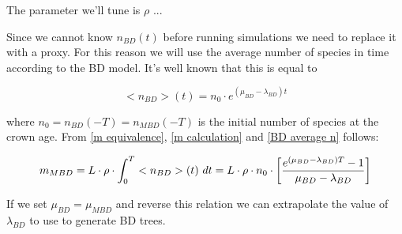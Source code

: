 \begin{itemize}
The parameter we'll tune is $\rho$ ... 

Since we cannot know $n_{BD}(t)$ before running simulations
we need to replace it with a proxy. 
For this reason we will use the average number of
species in time according to the BD model. 
It's well known that this is equal to 

\begin{equation}
    <n_{BD}>(t) = n_{0} \cdot e^{(\mu_{BD} - \lambda_{BD})t} \label{BD average n}
\end{equation}

where $n_{0} = n_{BD}(-T) = n_{MBD}(-T)$ is the initial number of species 
at the crown age.
From \ref{m equivalence}, \ref{m calculation} and \ref{BD average n} follows:

\begin{equation}
m_{MBD} = L \cdot \rho \cdot \int_{0}^{T} <n_{BD}>(t)\ dt \\
= L \cdot \rho \cdot n_{0} \cdot \left[ \frac{e^{(\mu_{BD} - \lambda_{BD})T} - 1}{\mu_{BD} - \lambda_{BD}} \right]
\end{equation}

If we set $\mu_{BD} = \mu_{MBD}$ and reverse this relation 
we can extrapolate the value of $\lambda_{BD}$ to use to generate BD trees.


\end{itemize}
